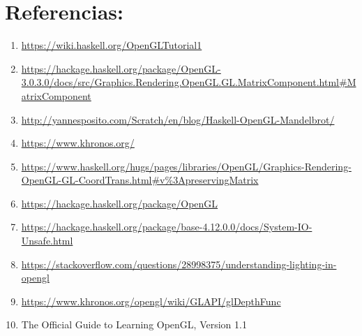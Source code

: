 \documentclass{article}
\begin{document}
\section{Referencias: }
\sloppy
\begin{enumerate}
    \item \url{https://wiki.haskell.org/OpenGLTutorial1}
    \item  \url{https://hackage.haskell.org/package/OpenGL-3.0.3.0/docs/src/Graphics.Rendering.OpenGL.GL.MatrixComponent.html#MatrixComponent}
    
    \item \url{http://yannesposito.com/Scratch/en/blog/Haskell-OpenGL-Mandelbrot/}
    
    \item \url{https://www.khronos.org/}
    
    \item \url{https://www.haskell.org/hugs/pages/libraries/OpenGL/Graphics-Rendering-OpenGL-GL-CoordTrans.html#v%3ApreservingMatrix}
    
    \item \url{https://hackage.haskell.org/package/OpenGL}
    
    \item \url{https://hackage.haskell.org/package/base-4.12.0.0/docs/System-IO-Unsafe.html}
    
    \item \url{https://stackoverflow.com/questions/28998375/understanding-lighting-in-opengl}
    
    \item \url{https://www.khronos.org/opengl/wiki/GLAPI/glDepthFunc}
    
    \item The Official Guide to Learning OpenGL, Version 1.1
\end{enumerate}
\end{document}
